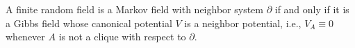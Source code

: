 A finite random field is a Markov field with neighbor system $\partial$ if and only if it is a Gibbs field whose canonical potential $V$ is a neighbor potential, i.e., $V_A \equiv 0$ whenever $A$ is not a clique with respect to $\partial$.
